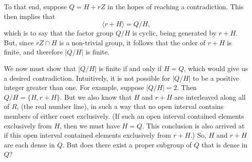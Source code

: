 \documentclass[12pt]{article}
\begin{document}
To that end, suppose $Q=H+rZ$ in the hopes of reaching a contradiction.  This then implies that
\begin{equation*}
\langle r+H\rangle = Q/H,
\end{equation*}
which is to say that the factor group $Q/H$ is cyclic, being generated by $r+H$.
But, since $rZ\cap H$ is a non-trivial group, it follows that the order of $r+H$
is finite, and therefore $|Q/H|$ is finite.

We now must show that $|Q/H|$ is finite if and only if $H=Q$, which would give
us a desired contradiction.  Intuitively, it is not possible for $|Q/H|$ to be a positive
integer greater than one.  For example, suppose $|Q/H|=2$.  Then $Q/H=\{H,r+H\}$.
But we also know that $H$ and $r+H$ are interleaved along all of $R$, (the real number line), in such a way that no
open interval contains members of either coset exclusively.  (If such an open interval contained
elements exclusively from $H$, then we must have $H=Q$.  This conclusion is also arrived at if this open interval
contained elements exclusively from $r+H$.)  So, $H$ and $r+H$ are each dense in $Q$.
But does there exist a proper subgroup of $Q$ that is dense in $Q$?
\end{document}
